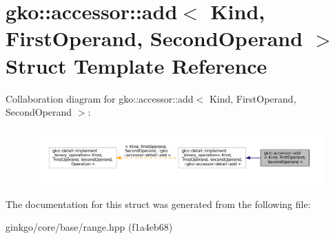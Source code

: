 \hypertarget{structgko_1_1accessor_1_1add}{}\section{gko\+:\+:accessor\+:\+:add$<$ Kind, First\+Operand, Second\+Operand $>$ Struct Template Reference}
\label{structgko_1_1accessor_1_1add}


Collaboration diagram for gko\+:\+:accessor\+:\+:add$<$ Kind, First\+Operand, Second\+Operand $>$\+:
\nopagebreak
\begin{figure}[H]
\begin{center}
\leavevmode
\includegraphics[width=350pt]{structgko_1_1accessor_1_1add__coll__graph}
\end{center}
\end{figure}


The documentation for this struct was generated from the following file\+:\begin{DoxyCompactItemize}
\item 
ginkgo/core/base/range.\+hpp (f1a4eb68)\end{DoxyCompactItemize}
